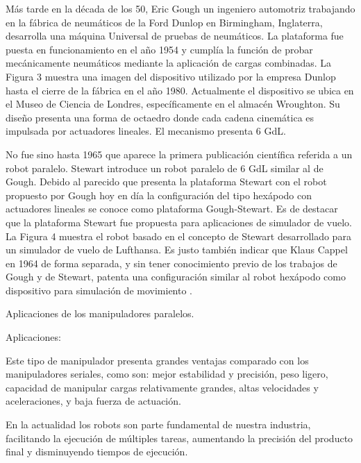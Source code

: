 \documentclass[a4paper,10pt]{article}
\begin{document}
Más tarde en la década de los 50, Eric Gough un ingeniero automotriz trabajando en la fábrica de
neumáticos de la Ford Dunlop en Birmingham, Inglaterra, desarrolla una máquina Universal de pruebas
de neumáticos. La plataforma fue puesta en funcionamiento en el año 1954 y cumplía la función de
probar mecánicamente neumáticos mediante la aplicación de cargas combinadas. La Figura 3 muestra
una imagen del dispositivo utilizado por la empresa Dunlop hasta el cierre de la fábrica en el año 1980.
Actualmente el dispositivo se ubica en el Museo de Ciencia de Londres, específicamente en el almacén
Wroughton. Su diseño presenta una forma de octaedro donde cada cadena cinemática es impulsada por
actuadores lineales. El mecanismo presenta 6 GdL.

No fue sino hasta 1965 que aparece la primera publicación científica referida a un robot paralelo.
Stewart introduce un robot paralelo de 6 GdL similar al de Gough. Debido al parecido que presenta
la plataforma Stewart con el robot propuesto por Gough hoy en día la configuración del tipo hexápodo
con actuadores lineales se conoce como plataforma Gough-Stewart. Es de destacar que la plataforma
Stewart fue propuesta para aplicaciones de simulador de vuelo. La Figura 4 muestra el robot basado en
el concepto de Stewart desarrollado para un simulador de vuelo de Lufthansa. Es justo también indicar
que Klaus Cappel en 1964 de forma separada, y sin tener conocimiento previo de los trabajos de Gough
y de Stewart, patenta una configuración similar al robot hexápodo como dispositivo para simulación de
movimiento .

Aplicaciones de los manipuladores paralelos.

Aplicaciones:

Este tipo de manipulador presenta grandes ventajas comparado con los manipuladores seriales, como son: mejor estabilidad y precisión, peso ligero, capacidad de manipular cargas relativamente grandes, altas velocidades y aceleraciones, y baja fuerza de actuación.

En la actualidad los robots son parte fundamental de nuestra industria, facilitando la ejecución de múltiples tareas, aumentando la precisión del producto final y disminuyendo tiempos de ejecución.
\end{document}

